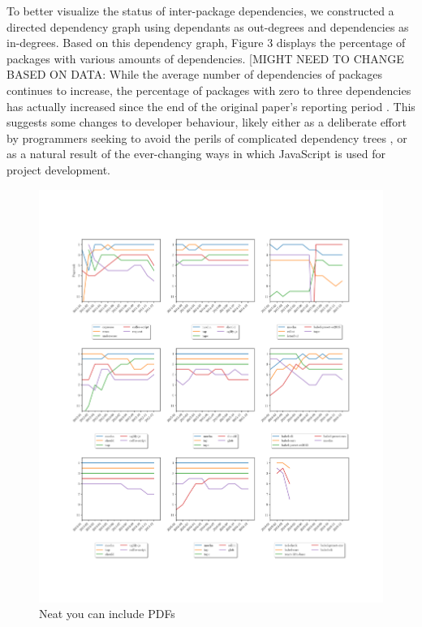 \documentclass[10pt,conference]{IEEEtran}
\begin{document}
To better visualize the status of inter-package dependencies, we constructed
a directed dependency graph using dependants as out-degrees and
dependencies as in-degrees. Based on this dependency graph, Figure 3
displays the percentage of packages with various amounts of dependencies. 
[MIGHT NEED TO CHANGE BASED ON DATA: While the average number of dependencies 
of packages continues to increase, the percentage of packages with zero 
to three dependencies has actually increased since the end of the original paper's
reporting period \cite{Wittern:2016}. This suggests some changes to developer 
behaviour, likely either as a deliberate effort by programmers seeking to avoid the perils of 
complicated dependency trees \cite{Kikas:2017}, or as a natural result of the ever-changing
ways in which JavaScript is used for project development.

\begin{figure}

  \includegraphics[width=1\textwidth]{figures/highest_ranked_monthly_100.pdf}
  \caption{Neat you can include PDFs}
  \label{ranksByYear}
\end{figure}
\end{document}
